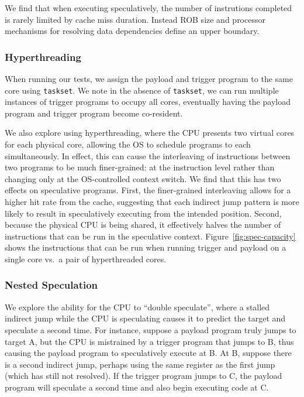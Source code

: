 \medskip

We find that when executing speculatively, the number of instrutions completed
is rarely limited by cache miss duration. Instead
ROB size and processor mechanisms for resolving
data dependencies define an upper boundary.


\subsubsection{Hyperthreading}

When running our tests, we assign the payload and trigger program to the same
core using \texttt{taskset}. We note in the absence of \texttt{taskset}, we can
run multiple instances of trigger programs to occupy all cores, eventually
having the payload program and trigger program become co-resident.

We also explore using hyperthreading, where the CPU presents two virtual cores
for each physical core, allowing the OS to schedule programs to each
simultaneously. In effect, this can cause the interleaving of instructions
between two programs to be much finer-grained: at the instruction level rather
than changing only at the OS-controlled context switch. We find that this
has two effects on speculative programs. First, the finer-grained interleaving
allows for a higher hit rate from the cache, suggesting that each indirect jump
pattern is more likely to result in speculatively executing from the intended
position. %
Second, because the physical CPU is being shared, it effectively halves the
number of instructions that can be run in the speculative context.
Figure~\ref{fig:spec-capacity} shows the instructions that can be run when
running trigger and payload on a single core vs.\ a pair of hyperthreaded cores.

\subsubsection{Nested Speculation}

We explore the ability for the CPU to ``double speculate'', where a stalled
indirect jump while the CPU is speculating causes it to predict the target and
speculate a second time. For instance, suppose a payload program truly jumps to
target A, but the CPU is mistrained by a trigger program that jumps to B, thus
causing the payload program to speculatively execute at B. At B, suppose there
is a second indirect jump, perhaps using the same register as the first jump
(which has still not resolved). If the trigger program jumps to C, the payload
program will speculate a second time and also begin executing code at C.

